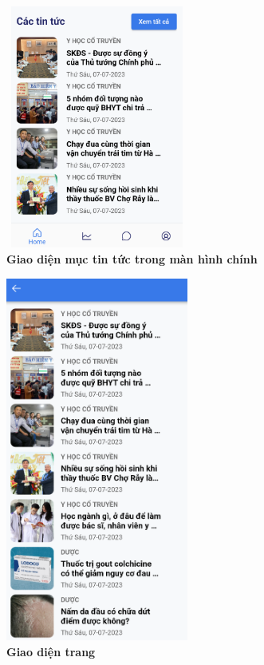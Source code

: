 \begin{figure}[H]
  \centering
  \includegraphics[width=6cm,height=8cm]{Images/mobile_app/demo/preview_news.png}
  \caption[Giao diện mục tin tức trong màn hình chính]{\bfseries \fontsize{12pt}{0pt}\selectfont Giao diện mục tin tức trong màn hình chính}
  \label{demo_} %
\end{figure}

\begin{figure}[H]
  \centering
  \includegraphics[width=6cm,height=12cm]{Images/mobile_app/demo/all_news.png}
  \caption[Giao diện trang]{\bfseries \fontsize{12pt}{0pt}\selectfont Giao diện trang}
  \label{demo_} %
\end{figure}

